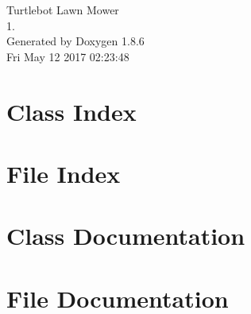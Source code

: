 \documentclass[twoside]{book}
\newcommand{\clearemptydoublepage}{%
  \newpage{\pagestyle{empty}\cleardoublepage}%
}
\begin{document}
\hypersetup{pageanchor=false}
\begin{titlepage}
\vspace*{7cm}
\begin{center}%
{\Large Turtlebot Lawn Mower \\[1ex]\large 1. }\\
\vspace*{1cm}
{\large Generated by Doxygen 1.8.6}\\
\vspace*{0.5cm}
{\small Fri May 12 2017 02:23:48}\\
\end{center}
\end{titlepage}
\clearemptydoublepage
\tableofcontents
\clearemptydoublepage
{}
\hypersetup{pageanchor=true}

\chapter{Class Index}

\chapter{File Index}

\chapter{Class Documentation}

\chapter{File Documentation}





\newpage
{}
{}
\printindex
\end{document}
